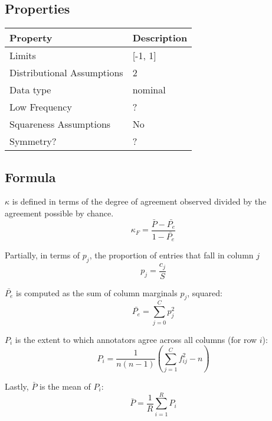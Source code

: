 \documentclass[11pt]{article}
\begin{document}
\subsection{Properties}
\begin{tabular}{| l || l |}
    \hline
    {\bf Property} & {\bf Description} \\
    \hline
    Limits & [-1, 1] \\ \hline

    Distributional Assumptions& 2 \\ \hline

    Data type & nominal \\ \hline

    Low Frequency & ? \\ \hline

    Squareness Assumptions & No \\ \hline
    
    Symmetry? & ? \\ \hline

\end{tabular}


\subsection{Formula}
$\kappa$ is defined in terms of the degree of agreement observed divided by the agreement possible by chance.
$$
\kappa_F = \frac{ \bar{P} - \bar{P_e} }{ 1 - \bar{P_e} }
$$

Partially, in terms of $p_j$, the proportion of entries that fall in column $j$
$$
p_j = \frac{ c_j }{S}
$$

$\bar{P_e}$ is computed as the sum of column marginals $p_j$, squared:
$$
\bar{P_e} = \sum_{j=0}^{C}{ p_j^2 }
$$

$P_i$ is the extent to which annotators agree across all columns (for row $i$):
$$
P_i = \frac{ 1 }{ n(n-1) }   \left( \sum_{j=1}^{C}{ f_{ij}^2 }  - n \right)
$$

Lastly, $\bar{P}$ is the mean of $P_i$:
$$
\bar{P} = \frac{ 1 }{ R }    \sum_{i=1}^{R}{ P_i }
$$
\end{document}
